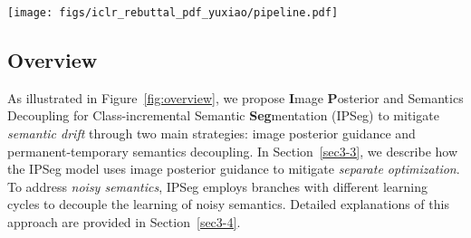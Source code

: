 
\begin{figure*}[t]
    \centering
    \texttt{[image: figs/iclr\_rebuttal\_pdf\_yuxiao/pipeline.pdf]}
    \caption{Overall architecture of our proposed IPSeg, mainly composed of image posterior and permanent-temporary semantics decoupling two parts. In the latter part, $\phi_p$ denotes the permanent learning branch and $\phi_1, \phi_2, ..., \phi_t$ for temporary ones. The black solid lines are used to indicate the data flow in training and the green ones are for inference.}
    \label{fig:overview}
\end{figure*}


\subsection{Overview}
\label{sec3-2:overview}

As illustrated in Figure~\ref{fig:overview}, we propose \textbf{I}mage \textbf{P}osterior and Semantics Decoupling for Class-incremental Semantic \textbf{Seg}mentation (IPSeg) to mitigate \textit{semantic drift} through two main strategies: image posterior guidance and permanent-temporary semantics decoupling. In Section~\ref{sec3-3}, we describe how the IPSeg model uses image posterior guidance to mitigate \textit{separate optimization}. 
To address \textit{noisy semantics}, IPSeg employs branches with different learning cycles to decouple the learning of noisy semantics. Detailed explanations of this approach are provided in Section~\ref{sec3-4}.




